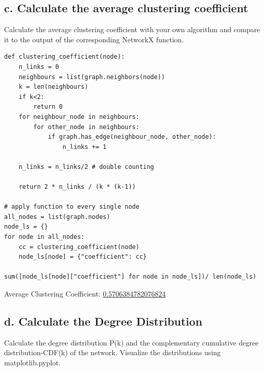 \documentclass[a4paper,12pt]{article}
\begin{document}
\subsection*{c. Calculate the average clustering coefficient}
Calculate the average clustering coefficient with your own algorithm and compare it to the output of the corresponding NetworkX function.
\begin{lstlisting}
def clustering_coefficient(node):
    n_links = 0
    neighbours = list(graph.neighbors(node))
    k = len(neighbours)
    if k<2:
        return 0
    for neighbour_node in neighbours:
        for other_node in neighbours:
            if graph.has_edge(neighbour_node, other_node):
                n_links += 1
    
    n_links = n_links/2 # double counting

    return 2 * n_links / (k * (k-1))
    
# apply function to every single node
all_nodes = list(graph.nodes)
node_ls = {}
for node in all_nodes:
    cc = clustering_coefficient(node)
    node_ls[node] = {"coefficient": cc}
    
sum([node_ls[node]["coefficient"] for node in node_ls])/ len(node_ls) 
\end{lstlisting}
Average Clustering Coefficient:  \underline{0.5706384782076824}

\subsection*{d. Calculate the Degree Distribution}
Calculate the degree distribution P(k) and the complementary cumulative degree distribution-CDF(k) of the network. Visualize the distributions using matplotlib.pyplot. 
\end{document}
